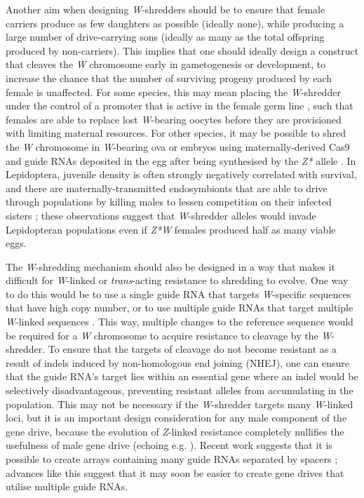 \documentclass[]{rsos}%
\begin{document}
Another aim when designing \emph{W}-shredders should be to ensure that
female carriers produce as few daughters as possible (ideally none),
while producing a large number of drive-carrying sons (ideally as many
as the total offspring produced by non-carriers). This implies that one
should ideally design a construct that cleaves the \emph{W} chromosome
early in gametogenesis or development, to increase the chance that the
number of surviving progeny produced by each female is unaffected. For
some species, this may mean placing the \emph{W}-shredder under the
control of a promoter that is active in the female germ line
\citep[perhaps \emph{nanos};][]{champer2018re, zhang2018si}, such that
females are able to replace lost \emph{W}-bearing oocytes before they
are provisioned with limiting maternal resources. For other species, it
may be possible to shred the \emph{W} chromosome in \emph{W}-bearing ova
or embryos using maternally-derived Cas9 and guide RNAs deposited in the
egg after being synthesised by the \emph{Z*} allele \citep[somewhat like
\emph{Medea};][]{hay2010en}. In Lepidoptera, juvenile density is often
strongly negatively correlated with survival, and there are
maternally-transmitted endosymbionts that are able to drive through
populations by killing males to lessen competition on their infected
sisters \citep[e.g.][]{jiggins2000bu, jiggins2003ma}; these observations
suggest that \emph{W}-shredder alleles would invade Lepidopteran
populations even if \emph{Z*W} females produced half as many viable
eggs.

The \emph{W}-shredding mechanism should also be designed in a way that
makes it difficult for \emph{W}-linked or \emph{trans}-acting resistance
to shredding to evolve. One way to do this would be to use a single
guide RNA that targets \emph{W}-specific sequences that have high copy
number, or to use multiple guide RNAs that target multiple
\emph{W}-linked sequences \citep{champer2018re}. This way, multiple
changes to the reference sequence would be required for a \emph{W}
chromosome to acquire resistance to cleavage by the \emph{W}-shredder.
To ensure that the targets of cleavage do not become resistant as a
result of indels induced by non-homologous end joining (NHEJ), one can
ensure that the guide RNA's target lies within an essential gene where
an indel would be selectively disadvantageous, preventing resistant
alleles from accumulating in the population. This may not be necessary
if the \emph{W}-shredder targets many \emph{W}-linked loci, but it is an
important design consideration for any male component of the gene drive,
because the evolution of \emph{Z}-linked resistance completely nullifies
the usefulness of male gene drive (echoing e.g. \citep{unckless2017ev}).
Recent work suggests that it is possible to create arrays containing
many guide RNAs separated by spacers \citep{kurata2018hi}; advances like
this suggest that it may soon be easier to create gene drives that
utilise multiple guide RNAs.
\end{document}

